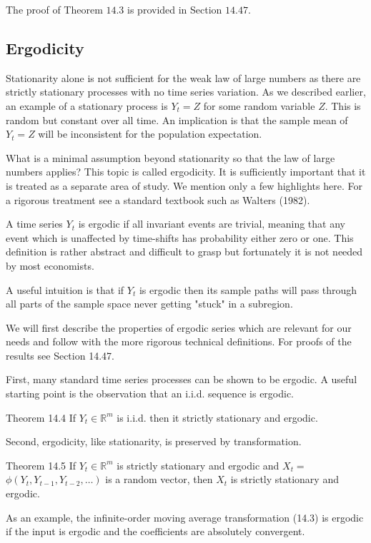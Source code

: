 \documentclass[10pt]{article}
\begin{document}
The proof of Theorem $14.3$ is provided in Section $14.47$.

\subsection{Ergodicity}
Stationarity alone is not sufficient for the weak law of large numbers as there are strictly stationary processes with no time series variation. As we described earlier, an example of a stationary process is $Y_{t}=Z$ for some random variable $Z$. This is random but constant over all time. An implication is that the sample mean of $Y_{t}=Z$ will be inconsistent for the population expectation.

What is a minimal assumption beyond stationarity so that the law of large numbers applies? This topic is called ergodicity. It is sufficiently important that it is treated as a separate area of study. We mention only a few highlights here. For a rigorous treatment see a standard textbook such as Walters (1982).

A time series $Y_{t}$ is ergodic if all invariant events are trivial, meaning that any event which is unaffected by time-shifts has probability either zero or one. This definition is rather abstract and difficult to grasp but fortunately it is not needed by most economists.

A useful intuition is that if $Y_{t}$ is ergodic then its sample paths will pass through all parts of the sample space never getting "stuck" in a subregion.

We will first describe the properties of ergodic series which are relevant for our needs and follow with the more rigorous technical definitions. For proofs of the results see Section 14.47.

First, many standard time series processes can be shown to be ergodic. A useful starting point is the observation that an i.i.d. sequence is ergodic.

Theorem 14.4 If $Y_{t} \in \mathbb{R}^{m}$ is i.i.d. then it strictly stationary and ergodic.

Second, ergodicity, like stationarity, is preserved by transformation.

Theorem 14.5 If $Y_{t} \in \mathbb{R}^{m}$ is strictly stationary and ergodic and $X_{t}=$ $\phi\left(Y_{t}, Y_{t-1}, Y_{t-2}, \ldots\right)$ is a random vector, then $X_{t}$ is strictly stationary and ergodic.

As an example, the infinite-order moving average transformation (14.3) is ergodic if the input is ergodic and the coefficients are absolutely convergent.
\end{document}
